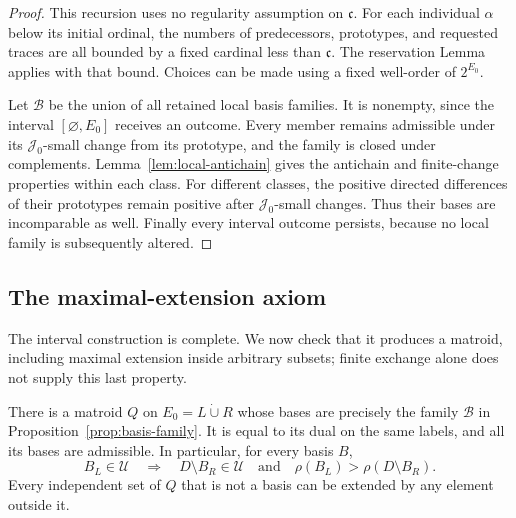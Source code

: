 \begin{proof}
This recursion uses no regularity assumption on $\mathfrak c$.
For each individual $\alpha$ below its initial ordinal, the numbers of
predecessors, prototypes, and requested traces are all bounded by a fixed
cardinal less than $\mathfrak c$.
The reservation Lemma applies with that bound.
Choices can be made using a fixed well-order of $2^{E_0}$.

Let $\mathcal B$ be the union of all retained local basis families.
It is nonempty, since the interval $[\varnothing,E_0]$ receives an outcome.
Every member remains admissible under its $\mathcal J_0$-small change
from its prototype, and the family is closed under complements.
Lemma~\ref{lem:local-antichain} gives the antichain and finite-change
properties within each class.
For different classes, the positive directed differences of their
prototypes remain positive after $\mathcal J_0$-small changes.
Thus their bases are incomparable as well.
Finally every interval outcome persists, because no local family is
subsequently altered.
\end{proof}

\subsection{The maximal-extension axiom}

The interval construction is complete.
We now check that it produces a matroid, including maximal extension
inside arbitrary subsets; finite exchange alone does not supply this
last property.

\begin{theorem}\label{thm:local-matroid}
There is a matroid $Q$ on $E_0=L\dot\cup R$ whose bases are precisely
the family $\mathcal B$ in Proposition~\ref{prop:basis-family}.
It is equal to its dual on the same labels, and all its bases are admissible.
In particular, for every basis $B$,
\begin{equation}\label{eq:basis-rank-decrease}
 B_L\in\mathcal U
 \quad\Longrightarrow\quad
 D\setminus B_R\in\mathcal U
 \quad\text{and}\quad
 \rho(B_L)>\rho(D\setminus B_R).
\end{equation}
Every independent set of $Q$ that is not a basis can be extended by any
element outside it.
\end{theorem}

